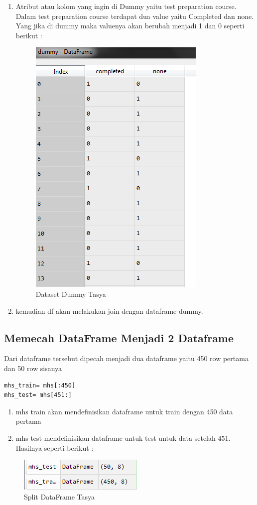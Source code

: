 \begin{enumerate}
\item Atribut atau kolom yang ingin di Dummy yaitu test preparation course. Dalam test preparation course terdapat dua value yaitu Completed dan none. Yang jika di dummy maka valuenya akan berubah menjadi 1 dan 0 seperti berikut :
\begin{figure}[ht]
\centering
\includegraphics[scale=0.5]{figures/praktektasya3.png}
\caption{Dataset Dummy Tasya}
\label{Aplikasi Pandas}
\end{figure}
\item kemudian df akan melakukan join dengan dataframe dummy.
\end{enumerate}

\subsection{Memecah DataFrame Menjadi 2 Dataframe}
Dari dataframe tersebut dipecah menjadi dua dataframe yaitu 450 row pertama dan 50 row sisanya
\begin{verbatim}
mhs_train= mhs[:450]
mhs_test= mhs[451:]
\end{verbatim}
\begin{enumerate}
\item mhs train akan mendefinisikan dataframe untuk train dengan 450 data pertama
\item mhs test mendefinisikan dataframe untuk test untuk data setelah 451. Hasilnya seperti berikut :
\end{enumerate}
\begin{figure}[ht]
\centering
\includegraphics[scale=0.5]{figures/praktektasya4.png}
\caption{Split DataFrame Tasya}
\label{Aplikasi Pandas}
\end{figure}

